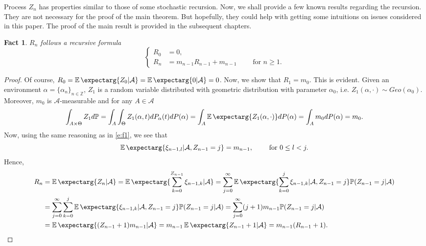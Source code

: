 \documentclass[12pt]{article}
\newcommand{\Pro}{\mathbb{P}}
\newcommand{\env}{\mathcal{A}}
\newcommand{\environ} {\alpha = \{ \alpha_n \}_{n\in \mathbb{Z} }}
\newtheorem{fact}[theorem]{Fact}
\newcommand{\expect}{\operatorname{\mathbb{E}}\expectarg}
\begin{document}
Process $Z_n$ has properties similar to those of some stochastic recursion. Now, we shall provide a few known results regarding the recursion. They are not necessary for the proof of the main theorem. But hopefully, they could help with getting some intuitions on issues considered in this paper. The proof of the main result is provided in the subsequent chapters.

\begin{fact}
    $R_n$ follows a recursive formula
    \begin{equation} \label{e:f2}
    \begin{cases}
        R_0 &= 0, \\
        R_n &= m_{n-1}R_{n-1} + m_{n-1} \qquad \text{ for } n \geq 1.
    \end{cases}
    \end{equation}
\end{fact}
\begin{proof}
Of course, $R_0 = \expect{Z_0|\env} = \expect{0|\env} = 0$. Now, we show that $R_1 = m_0$.     This is evident. Given an environment  $\environ$, $Z_1$ is a random variable distributed with geometric distribution with parameter $\alpha_0$, i.e. $Z_1(\alpha, \cdot) \sim Geo(\alpha_0)$. Moreover, $m_0$ is $\env$-measurable and for any $A \in \env$
\begin{equation} \label{e:f1}
    \int_{A \times \Theta} Z_1 d\mathbb{P} = \int_{A} \int_{\Theta} Z_1(\alpha, t) dP_\alpha(t) dP(\alpha) = \int_A \expect{Z_1(\alpha, \cdot)} dP(\alpha) = \int_A m_0 dP(\alpha) = m_0.
\end{equation} 
Now, using the same reasoning as in \eqref{e:f1}, we see that 
\begin{equation*}
    \expect{ \xi_{n-1,l} | \env, Z_{n-1} = j} = m_{n-1}, \qquad \text{ for } 0 \leq l < j.
\end{equation*}
Hence, 
\begin{equation*}
\begin{aligned}
    R_n &= \expect{Z_n|\env} = \expect{\sum_{k=0}^{Z_{n-1}} \xi_{n-1,k} |\env} = \sum_{j=0}^{\infty} \expect{\sum_{k=0}^{j} \xi_{n-1,k} | \env, Z_{n-1} = j} \Pro(Z_{n-1} = j | \env)  \\ 
    &= \sum_{j=0}^{\infty} \sum_{k=0}^{j} \expect{ \xi_{n-1,k} | \env, Z_{n-1} = j} \Pro(Z_{n-1} = j | \env) =  \sum_{j=0}^{\infty} (j+1)m_{n-1}\Pro(Z_{n-1} = j | \env)  \\
    &= \expect{(Z_{n-1} + 1)m_{n-1}|\env} = m_{n-1} \expect{Z_{n-1} +1 | \env} = m_{n-1}(R_{n-1}+1).
\end{aligned}
\end{equation*}
\end{proof}
\end{document}
